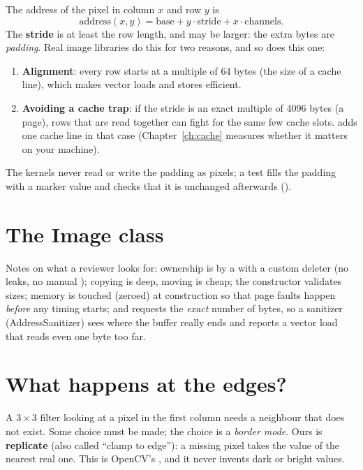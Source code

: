 The address of the pixel in column $x$ and row $y$ is
\[
\text{address}(x,y)=\text{base}+y\cdot\text{stride}+x\cdot\text{channels}.
\]
The \textbf{stride} is at least the row length, and may be larger: the extra bytes are \emph{padding}. Real image libraries do this for two reasons, and so does this one:
\begin{enumerate}
\item \textbf{Alignment}: every row starts at a multiple of 64 bytes (the size of a cache line), which makes vector loads and stores efficient.
\item \textbf{Avoiding a cache trap}: if the stride is an exact multiple of 4096 bytes (a page), rows that are read together can fight for the same few cache slots.  adds one cache line in that case (Chapter~\ref{ch:cache} measures whether it matters on your machine).
\end{enumerate}
The kernels never read or write the padding as pixels; a test fills the padding with a marker value and checks that it is unchanged afterwards ().

\section{The Image class}



Notes on what a reviewer looks for: ownership is by a  with a custom deleter (no leaks, no manual ); copying is deep, moving is cheap; the constructor validates sizes; memory is touched (zeroed) at construction so that page faults happen \emph{before} any timing starts; and  requests the \emph{exact} number of bytes, so a sanitizer (AddressSanitizer) sees where the buffer really ends and reports a vector load that reads even one byte too far.

\section{What happens at the edges?}

A $3\times3$ filter looking at a pixel in the first column needs a neighbour that does not exist. Some choice must be made; the choice is a \emph{border mode}. Ours is \textbf{replicate} (also called ``clamp to edge''): a missing pixel takes the value of the nearest real one. This is OpenCV's , and it never invents dark or bright values.

